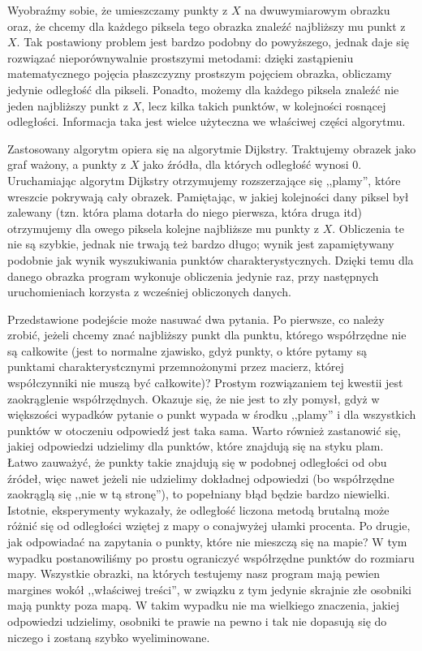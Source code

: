 \documentclass[a4paper,12pt,leqno]{article}
\begin{document}
Wyobraźmy sobie, że umieszczamy punkty z $X$ na dwuwymiarowym obrazku oraz, że chcemy dla każdego piksela tego obrazka znaleźć najbliższy mu punkt z $X$. Tak postawiony problem jest
bardzo podobny do powyższego, jednak daje się rozwiązać nieporównywalnie prostszymi metodami: dzięki zastąpieniu matematycznego pojęcia płaszczyzny prostszym pojęciem obrazka, obliczamy
jedynie odległość dla pikseli. Ponadto, możemy dla każdego piksela znaleźć nie jeden najbliższy punkt z $X$, lecz kilka takich punktów, w kolejności rosnącej odległości. Informacja taka
jest wielce użyteczna we właściwej części algorytmu.

Zastosowany algorytm opiera się na algorytmie Dijkstry. Traktujemy obrazek jako graf ważony, a punkty z $X$ jako źródła, dla których odległość wynosi $0$. Uruchamiając algorytm Dijkstry
otrzymujemy rozszerzające się ,,plamy'', które wreszcie pokrywają cały obrazek. Pamiętając, w jakiej kolejności dany piksel był zalewany (tzn. która plama dotarła do niego pierwsza, która
druga itd) otrzymujemy dla owego piksela kolejne najbliższe mu punkty z $X$. Obliczenia te nie są szybkie, jednak nie trwają też bardzo długo; wynik jest zapamiętywany podobnie jak wynik
wyszukiwania punktów charakterystycznych. Dzięki temu dla danego obrazka program wykonuje obliczenia jedynie raz, przy następnych uruchomieniach korzysta z wcześniej obliczonych danych.

Przedstawione podejście może nasuwać dwa pytania. Po pierwsze, co należy zrobić, jeżeli chcemy znać najbliższy punkt dla punktu, którego współrzędne nie są całkowite (jest to normalne
zjawisko, gdyż punkty, o które pytamy są punktami charakterystcznymi przemnożonymi przez macierz, której współczynniki nie muszą być całkowite)? Prostym rozwiązaniem tej kwestii jest
zaokrąglenie współrzędnych. Okazuje się, że nie jest to zły pomysł, gdyż w większości wypadków pytanie o punkt wypada w środku ,,plamy'' i dla wszystkich punktów w otoczeniu odpowiedź
jest taka sama. Warto również zastanowić się, jakiej odpowiedzi udzielimy dla punktów, które znajdują się na styku plam. Łatwo zauważyć, że punkty takie znajdują się w podobnej odległości
od obu źródeł, więc nawet jeżeli nie udzielimy dokładnej odpowiedzi (bo współrzędne zaokrąglą się ,,nie w tą stronę''), to popełniany błąd będzie bardzo niewielki. Istotnie, eksperymenty
wykazały, że odległość liczona metodą brutalną może różnić się od odległości wziętej z mapy o conajwyżej ułamki procenta. Po drugie, jak odpowiadać na zapytania o punkty, które nie mieszczą
się na mapie? W tym wypadku postanowiliśmy po prostu ograniczyć współrzędne punktów do rozmiaru mapy. Wszystkie obrazki, na których testujemy nasz program mają pewien margines wokół
,,właściwej treści'', w związku z tym jedynie skrajnie złe osobniki mają punkty poza mapą. W takim wypadku nie ma wielkiego znaczenia, jakiej odpowiedzi udzielimy, osobniki te prawie na
pewno i tak nie dopasują się do niczego i zostaną szybko wyeliminowane.
\end{document}
